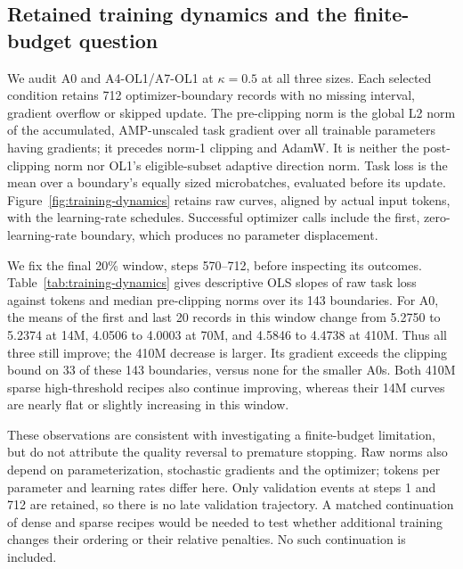 \subsection{Retained training dynamics and the finite-budget question}
\label{app:training-dynamics}

We audit A0 and A4-OL1/A7-OL1 at $\kappa=0.5$ at all three sizes.
Each selected condition retains 712 optimizer-boundary records with no
missing interval, gradient overflow or skipped update. The pre-clipping
norm is the global L2 norm of the accumulated, AMP-unscaled task gradient
over all trainable parameters having gradients; it precedes norm-1 clipping
and AdamW. It is neither the post-clipping norm nor OL1's eligible-subset
adaptive direction norm. Task loss is the mean over a boundary's equally
sized microbatches, evaluated before its update. Figure~\ref{fig:training-dynamics}
retains raw curves, aligned by actual input tokens, with the learning-rate
schedules. Successful optimizer calls include the first, zero-learning-rate
boundary, which produces no parameter displacement.

We fix the final 20\% window, steps 570--712, before inspecting its outcomes.
Table~\ref{tab:training-dynamics} gives descriptive OLS slopes of raw task
loss against tokens and median pre-clipping norms over its 143 boundaries.
For A0, the means of the first and last 20 records in this window change
from 5.2750 to 5.2374 at 14M, 4.0506 to 4.0003 at 70M, and 4.5846 to
4.4738 at 410M. Thus all three still improve; the 410M decrease is larger.
Its gradient exceeds the clipping bound on 33 of these 143 boundaries,
versus none for the smaller A0s. Both 410M sparse high-threshold recipes
also continue improving, whereas their 14M curves are nearly flat or
slightly increasing in this window.

\begin{table}[htbp]
\centering\small
\caption{Late-run diagnostics on steps 570--712. Slopes use raw training
task loss per billion input tokens, not validation loss or independent
seed replicates. Sparse recipes use $\kappa=0.5$.}
\label{tab:training-dynamics}

\end{table}

These observations are consistent with investigating a finite-budget
limitation, but do not attribute the quality reversal to premature stopping.
Raw norms also depend on parameterization, stochastic gradients and the
optimizer; tokens per parameter and learning rates differ here. Only
validation events at steps 1 and 712 are retained, so there is no late
validation trajectory. A matched continuation of dense and sparse recipes
would be needed to test whether additional training changes their ordering
or their relative penalties. No such continuation is included.

